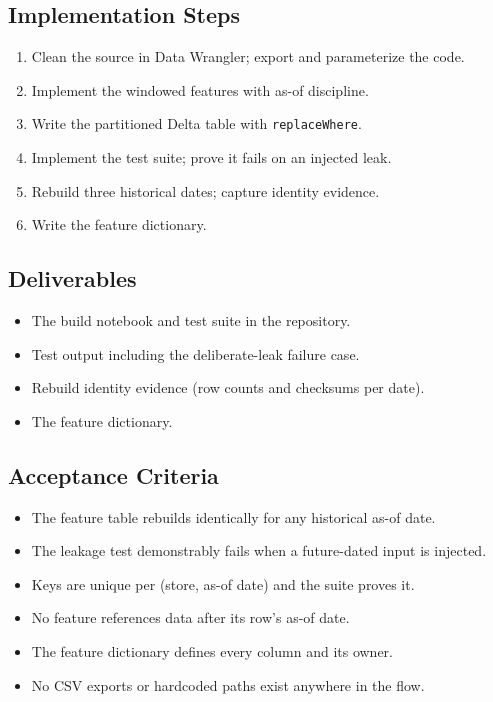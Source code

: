 \subsection*{Implementation Steps}
\begin{enumerate}
    \item Clean the source in Data Wrangler; export and parameterize the code.
    \item Implement the windowed features with as-of discipline.
    \item Write the partitioned Delta table with \texttt{replaceWhere}.
    \item Implement the test suite; prove it fails on an injected leak.
    \item Rebuild three historical dates; capture identity evidence.
    \item Write the feature dictionary.
\end{enumerate}

\subsection*{Deliverables}
\begin{itemize}
    \item The build notebook and test suite in the repository.
    \item Test output including the deliberate-leak failure case.
    \item Rebuild identity evidence (row counts and checksums per date).
    \item The feature dictionary.
\end{itemize}

\subsection*{Acceptance Criteria}
\begin{itemize}
    \item[\(\square\)] The feature table rebuilds identically for any historical as-of date.
    \item[\(\square\)] The leakage test demonstrably fails when a future-dated input is injected.
    \item[\(\square\)] Keys are unique per (store, as-of date) and the suite proves it.
    \item[\(\square\)] No feature references data after its row's as-of date.
    \item[\(\square\)] The feature dictionary defines every column and its owner.
    \item[\(\square\)] No CSV exports or hardcoded paths exist anywhere in the flow.
\end{itemize}

